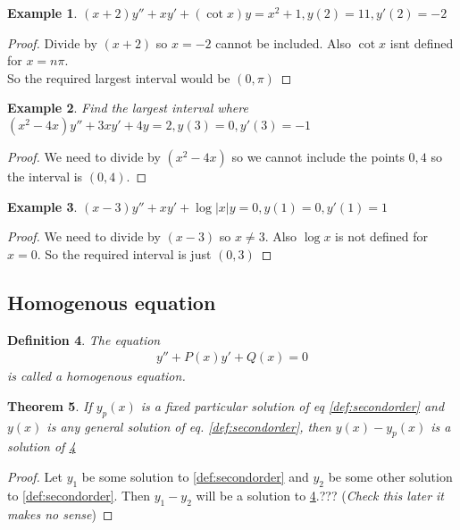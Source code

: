 \documentclass[oneside,11pt,pdftex,final]{book}%
\numberwithin{equation}{section}
\newtheorem{theorem}{Theorem}[chapter]%
\newtheorem{example}[theorem]{Example}
\newtheorem{definition}[theorem]{Definition}
\numberwithin{section}{chapter}
\numberwithin{equation}{chapter}
\begin{document}
\begin{example}
	$ (x+2)y''+xy'+(\cot x)y=x^2+1, y(2) =11, y'(2)=-2$
\end{example}
\begin{proof}
	Divide by $ (x+2) $ so $ x=-2 $ cannot be included. Also $ \cot x $ isnt defined for $ x=n\pi  $.\\
	So the required largest interval would be $ (0,\pi) $
\end{proof}

\begin{example}
	Find the largest interval where $ (x^2-4x) y''+3xy' +4y=2, y(3)=0, y'(3)=-1$
\end{example}
\begin{proof}
	We need to divide by $ (x^2-4x) $ so we cannot include the points $ 0, 4 $ so the interval is $ (0,4) $.
\end{proof}

\begin{example}
	$(x-3)y''+xy'+\log|x| y=0, y(1)=0,y'(1)=1$
\end{example}
\begin{proof}
	We need to divide by $(x-3)$ so $ x\neq 3 $. Also $ \log x $ is not defined for $ x=0 $. So the required interval is just $ (0,3) $
\end{proof}

\subsection{Homogenous equation}
\begin{definition}\label{def:2ndhomo}
	The equation \begin{align*}
		y''+P(x) y'+Q(x)=0
	\end{align*}  is called a homogenous equation.
\end{definition}

\begin{theorem}
	If $ y_p(x) $ is a fixed particular solution of eq \ref{def:secondorder} and $ y(x) $ is any general solution of eq. \ref{def:secondorder}, then $ y(x) -y_p(x)$ is a solution of \ref{def:2ndhomo}
\end{theorem}
\begin{proof}
	Let $ y_1 $ be some solution to \ref{def:secondorder} and $ y_2 $ be some other solution to \ref{def:secondorder}. Then $ y_1-y_2 $ will be a solution to \ref{def:2ndhomo}.??? (\emph{Check this later it makes no sense})
\end{proof}
\end{document}
